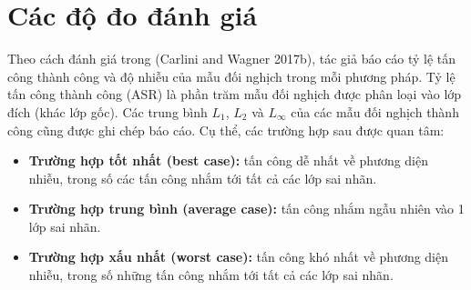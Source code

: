 \section{Các độ đo đánh giá}
Theo cách đánh giá trong (Carlini and Wagner 2017b), tác giả báo cáo tỷ lệ tấn công thành công và độ nhiễu của mẫu đối nghịch trong mỗi phương pháp. Tỷ lệ tấn công thành công (ASR) là phần trăm mẫu đối nghịch được phân loại vào lớp đích (khác lớp gốc). Các trung bình $L_1$, $L_2$ và $L_{\infty}$ của các mẫu đối nghịch thành công cũng được ghi chép báo cáo. Cụ thể, các trường hợp sau được quan tâm:
\begin{itemize}
    \item \textbf{Trường hợp tốt nhất (best case):} tấn công dễ nhất về phương diện nhiễu, trong số các tấn công nhắm tới tất cả các lớp sai nhãn.
    \item \textbf{Trường hợp trung bình (average case):} tấn công nhắm ngẫu nhiên vào 1 lớp sai nhãn.
    \item \textbf{Trường hợp xấu nhất (worst case):} tấn công khó nhất về phương diện nhiễu, trong số những tấn công nhắm tới tất cả các lớp sai nhãn.
\end{itemize}